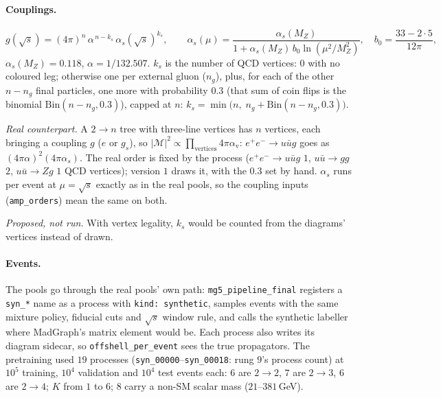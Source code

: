 \documentclass[11pt]{article}
\newcommand{\code}[1]{\texttt{#1}}
\begin{document}
\paragraph{Couplings.}
\begin{equation}
  g(\sqrt s)=(4\pi)^n\,\alpha^{\,n-k_s}\,\alpha_s(\sqrt s)^{k_s},\qquad
  \alpha_s(\mu)=\frac{\alpha_s(M_Z)}{1+\alpha_s(M_Z)\,b_0\ln(\mu^2/M_Z^2)},\quad b_0=\frac{33-2\cdot5}{12\pi},
  \label{eq:syn-coup}
\end{equation}
$\alpha_s(M_Z)=0.118$, $\alpha=1/132.507$. $k_s$ is the number of QCD vertices: $0$ with no coloured leg; otherwise one
per external gluon ($n_g$), plus, for each of the other $n-n_g$ final particles, one more with probability $0.3$ (that sum
of coin flips is the binomial $\mathrm{Bin}(n-n_g,0.3)$), capped at $n$: $k_s=\min\!\big(n,\;n_g+\mathrm{Bin}(n-n_g,0.3)\big)$.
\par\smallskip\noindent \emph{Real counterpart.} A $2\to n$ tree with three-line vertices has $n$ vertices, each bringing a coupling $g$ ($e$ or
$g_s$), so $|\mathcal M|^2\propto\prod_\text{vertices}4\pi\alpha_\text{v}$: $e^+e^-\to u\bar ug$ goes as
$(4\pi\alpha)^2(4\pi\alpha_s)$. The real order is fixed by the process ($e^+e^-\to u\bar ug$ $1$, $u\bar u\to gg$ $2$,
$u\bar u\to Zg$ $1$ QCD vertices); version $1$ draws it, with the $0.3$ set by hand. $\alpha_s$ runs per event at
$\mu=\sqrt s$ exactly as in the real pools, so the coupling inputs (\code{amp\_orders}) mean the same on both.
\par\smallskip\noindent \emph{Proposed, not run.} With vertex legality, $k_s$ would be counted from the diagrams' vertices instead of drawn.

\paragraph{Events.} The pools go through the real pools' own path: \code{mg5\_pipeline\_final} registers a \code{syn\_*}
name as a process with \code{kind: synthetic}, samples events with the same mixture policy, fiducial cuts and $\sqrt s$
window rule, and calls the synthetic labeller where MadGraph's matrix element would be. Each process also writes its
diagram sidecar, so \code{offshell\_per\_event} sees the true propagators. The pretraining used $19$ processes
(\code{syn\_00000}--\code{syn\_00018}: rung $9$'s process count) at $10^5$ training, $10^4$ validation and $10^4$ test
events each: $6$ are $2\to2$, $7$ are $2\to3$, $6$ are $2\to4$; $K$ from $1$ to $6$; $8$ carry a non-SM scalar mass
($21$--$381$\,GeV).
\end{document}
